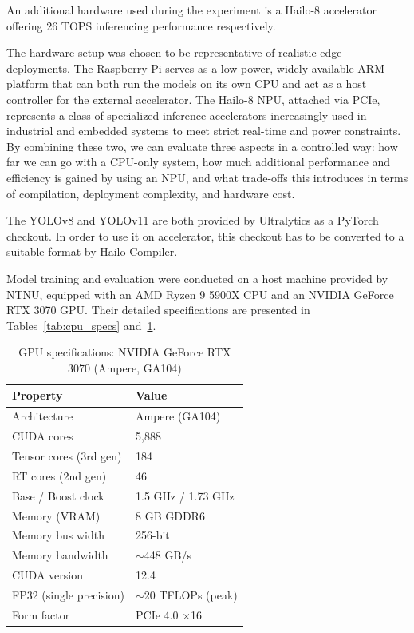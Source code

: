\documentclass[12pt,a4paper]{report}
\begin{document}
    An additional hardware used during the experiment is a Hailo-8
    accelerator offering 26 TOPS inferencing performance
    respectively.

    The hardware setup was chosen to be representative of realistic edge deployments.
    The Raspberry Pi serves as a low-power, widely available ARM platform that can both run the models on its own CPU
    and act as a host controller for the external accelerator. The Hailo-8 NPU, attached via PCIe,
    represents a class of specialized inference accelerators increasingly used in industrial and embedded systems
    to meet strict real-time and power constraints. By combining these two, we can evaluate three aspects in a
    controlled way: how far we can go with a CPU-only system, how much additional performance and efficiency
    is gained by using an NPU, and what trade-offs this introduces in terms of compilation,
    deployment complexity, and hardware cost.

    \vspace{0.8em}
    The YOLOv8 and YOLOv11 are both provided by Ultralytics
    as a PyTorch checkout. In order to use it on accelerator, this checkout has
    to be converted to a suitable format by Hailo Compiler.

    \vspace{0.8em}
    Model training and evaluation were conducted on a host machine provided by NTNU,
    equipped with an AMD Ryzen 9 5900X CPU and an NVIDIA GeForce RTX 3070 GPU.
    Their detailed specifications are presented in Tables~\ref{tab:cpu_specs} and~\ref{tab:gpu_specs}.

        \begin{table}[H]
      \centering
      \caption{GPU specifications: NVIDIA GeForce RTX 3070 (Ampere, GA104)}
      \label{tab:gpu_specs}
      \begin{tabular}{@{}ll@{}}
        \toprule
        \textbf{Property} & \textbf{Value} \\
        \midrule
        Architecture            & Ampere (GA104) \\
        CUDA cores              & 5,888 \\
        Tensor cores (3rd gen)  & 184 \\
        RT cores (2nd gen)      & 46 \\
        Base / Boost clock      & 1.5 GHz / 1.73 GHz \\
        Memory (VRAM)           & 8 GB GDDR6 \\
        Memory bus width        & 256-bit \\
        Memory bandwidth        & \(\sim\)448 GB/s \\
        CUDA version            & 12.4 \\
        FP32 (single precision) & \(\sim\)20 TFLOPs (peak) \\
        Form factor             & PCIe 4.0 \(\times\)16 \\
        \bottomrule
      \end{tabular}
    \end{table}
\end{document}
